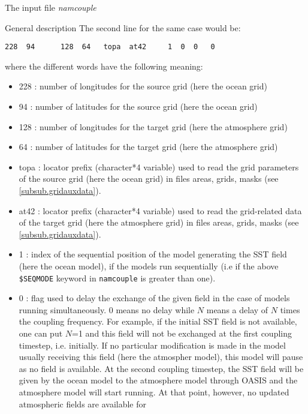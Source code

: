 \begin{subsection}{The input file {\it namcouple}}
\begin{subsubsection}{General description}
The second line for the same case would be:
\begin{verbatim}
228  94      128  64   topa  at42     1  0  0   0
\end{verbatim}
where the different words have the following meaning:
    \begin{itemize}
      \item 228 : number of longitudes for the source grid (here
            the ocean grid)
      \item 94 : number of latitudes for the source grid (here
            the ocean grid)
      \item 128 : number of longitudes for the target grid (here
            the atmosphere grid)
      \item 64 : number of latitudes for the target grid (here
            the atmosphere grid)
      \item topa : locator prefix (character*4 variable) 
            used to read the grid parameters of the source
            grid (here the ocean grid) in files areas, grids, masks
            (see \ref{subsub.gridauxdata}).
      \item at42 : locator prefix (character*4 variable)
            used to read the grid-related data of the target
            grid (here the atmosphere grid) in files areas, grids, masks
            (see \ref{subsub.gridauxdata}).
      \item 1 : index of the sequential position of the model
            generating the SST field (here the ocean model), if the
            models run sequentially (i.e if the above {\tt \$SEQMODE} keyword 
            in {\tt namcouple} is greater than one).
      \item 0 : flag used to delay the exchange of the given field in
            the case of models running simultaneously. $0$ means
            no delay while $N$ means a delay of $N$ times the coupling
            frequency. For example, if the initial SST field is not
            available, one can put $N$=1 and this field will not be
            exchanged at the first coupling timestep, i.e. initially. 
            If no particular
            modification is made in the model usually receiving this
            field (here the atmospher model), this model will pause as
            no field is available.
            At the second coupling timestep, the SST field will be
            given by the ocean model to the atmosphere model through
            OASIS and the atmosphere model will start running. At that
            point, however, no updated atmospheric fields are available for

\end{itemize}
\end{subsubsection}
\end{subsection}
